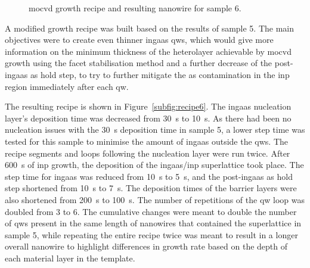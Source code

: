\begin{figure}
{
    }
    \caption{\acs{mocvd} growth recipe  and resulting nanowire  for sample 6.}
    \label{fig:s6_recipe+OV}
\end{figure}

A modified growth recipe was built based on the results of sample 5. The main objectives were to create even thinner \acs{ingaas} \acl{qw}s, which would give more information on the minimum thickness of the heterolayer achievable by \acs{mocvd} growth using the facet stabilisation method and a further decrease of the post-\acs{ingaas} \acl{as} hold step, to try to further mitigate the \acl{as} contamination in the \acs{inp} region immediately after each \acl{qw}.

The resulting recipe is shown in Figure~\ref{subfig:recipe6}. The \acs{ingaas} nucleation layer's deposition time was decreased from \qty{30}{\second} to \qty{10}{\second}. As there had been no nucleation issues with the \qty{30}{\second} deposition time in sample 5, a lower step time was tested for this sample to minimise the amount of \acs{ingaas} outside the \acl{qw}s. The recipe segments and loops following the nucleation layer were run twice. After \qty{600}{\second} of \acs{inp} growth, the deposition of the \acs{ingaas}/\acs{inp} superlattice took place. The step time for \acs{ingaas} was reduced from \qty{10}{\second} to \qty{5}{\second}, and the post-\acs{ingaas} \acl{as} hold step shortened from \qty{10}{\second} to \qty{7}{\second}. The deposition times of the barrier layers were also shortened from \qty{200}{\second} to \qty{100}{\second}. The number of repetitions of the \acl{qw} loop was doubled from \num{3} to \num{6}. The cumulative changes were meant to double the number of \acl{qw}s present in the same length of nanowires that contained the superlattice in sample 5, while repeating the entire recipe twice was meant to result in a longer overall nanowire to highlight differences in growth rate based on the depth of each material layer in the template.

